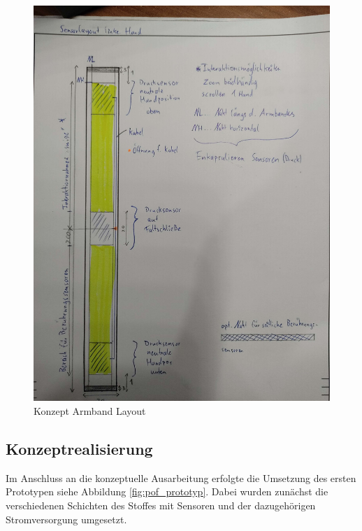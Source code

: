 \documentclass[11pt, a4paper]{article}
\begin{document}
\begin{figure}[h]
	\centering
	\includegraphics[scale=.09]{assets/Design_drawing.jpg}
	\caption{Konzept Armband Layout}
	\label{fig:concept_layout}
\end{figure}


\newpage

\subsection{Konzeptrealisierung}
\label{sec:hw_proc_realisation}


Im Anschluss an die konzeptuelle Ausarbeitung erfolgte die Umsetzung des ersten Prototypen siehe Abbildung \ref{fig:pof_prototyp}. 
Dabei wurden zunächst die verschiedenen Schichten des Stoffes mit Sensoren und der dazugehörigen Stromversorgung umgesetzt.\\
\end{document}
